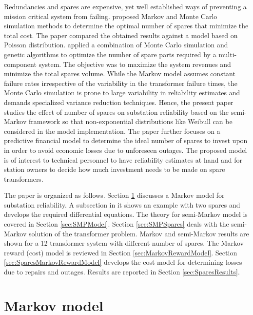 \documentclass[letterpaper, 12pt]{article}
\begin{document}
Redundancies and spares are expensive, yet well established ways of preventing a mission critical system from failing. 
\cite{Silva2010} proposed Markov and Monte Carlo simulation methods to determine the optimal number of spares that minimize the total cost. The paper compared the obtained results against a model based on Poisson distribution. 
\cite{Marseguerra2005325} applied a combination of Monte Carlo simulation and genetic algorithms to optimize the number of spare parts required by a multi-component system. The objective was to maximize the system revenues and minimize the total spares volume. While the Markov model assumes constant failure rates irrespective of the variability in the transformer failure times, the Monte Carlo simulation is prone to large variability in reliability estimates and demands specialized variance reduction techniques. Hence, the present paper studies the effect of  number of spares on substation reliability based on the semi-Markov framework so that non-exponential distributions like Weibull can be considered in the model implementation. 
The paper further focuses on a predictive financial model to determine the ideal number of spares to invest upon in order to avoid economic losses due to unforeseen outages. The proposed model is of interest to technical personnel to have reliability estimates at hand and for station owners to decide how much investment needs to be made on spare transformers.



The paper is organized as follows. Section \ref{sec:SparesMarkovModel} discusses a Markov model for substation reliability. A subsection in it shows an example with two spares and develops the required differential equations.  The theory for semi-Markov model is covered in Section \ref{sec:SMPModel}. Section \ref{sec:SMPSpares} deals with the semi-Markov solution of the transformer problem. Markov and semi-Markov results are shown for a 12 transformer system with different number of spares. 
The Markov reward (cost) model is reviewed in Section \ref{sec:MarkovRewardModel}. Section \ref{sec:SparesMarkovRewardModel} develops the cost model for determining losses due to repairs and outages. Results are reported in Section \ref{sec:SparesResults}. 


\section{Markov model}
\label{sec:SparesMarkovModel}
\end{document}
